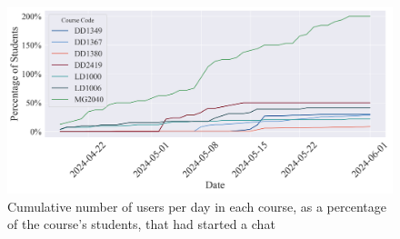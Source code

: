 \begin{figure}[H]
    \centering
    \includegraphics[width=1\textwidth]{results/plots/assets/usage-07-number-of-sessions-per-day-and-course.png}
    \caption{Cumulative number of users per day in each course, as a percentage of the course's students, that had started a chat}
    \label{fig:usage_07_number_of_sessions_per_day_and_course}
\end{figure}